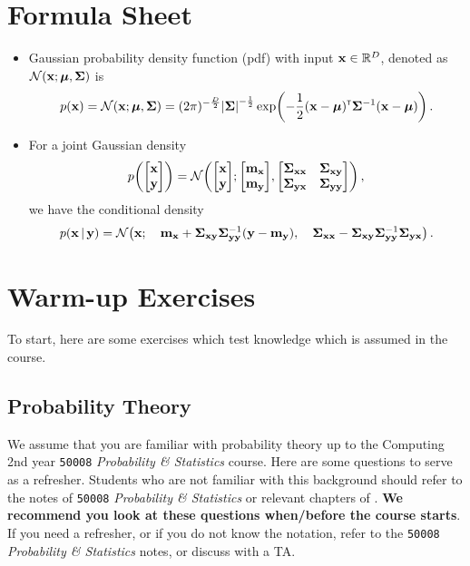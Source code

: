 \documentclass[a4paper]{article}
\newcommand{\mx}{\vm_\vx}
\newcommand{\my}{\vm_\vy}
\newcommand{\covmat}{\boldsymbol{\Sigma}}
\newcommand{\covx}{\boldsymbol{\Sigma}_{\vx\vx}}
\newcommand{\covy}{\boldsymbol{\Sigma}_{\vy\vy}}
\newcommand{\covxy}{\boldsymbol{\Sigma}_{\vx\vy}}
\newcommand{\covyx}{\boldsymbol{\Sigma}_{\vy\vx}}
\theoremstyle{definition}
\newcommand{\courseprobstats}{\texttt{50008} \textit{Probability \& Statistics}}
\begin{document}
\section{Formula Sheet}
\begin{itemize}
\item Gaussian probability density function (pdf) with input $\mathbf{x} \in \mathbb{R}^D$, denoted as  $\NormDist{\vx; \vmu, \covmat}$ is
\begin{align}
  p(\vx) = \NormDist{\vx; \vmu, \covmat} = (2\pi)^{-\frac{D}{2}}\detbar{\mathbf{\Sigma}}^{-\frac{1}{2}}\exp\left(-\frac{1}{2}(\vx - \vmu)\transpose\mathbf{\Sigma}^{-1}(\vx-\vmu)\right) \,.
\end{align}
\item For a joint Gaussian density
\begin{align}
\p{\begin{bmatrix}\vx \\ \vy\end{bmatrix}} = \NormDist{\begin{bmatrix}\vx \\ \vy\end{bmatrix}; \begin{bmatrix}\mx \\ \my\end{bmatrix}, \begin{bmatrix}\covx & \covxy \\ \covyx & \covy\end{bmatrix}} \label{eq:gauss-cond-joint} \,,
\end{align}
we have the conditional density
\begin{align}
\p{\vx\given\vy} = \NormDist{\vx; \quad\mx + \covxy\covy\inv(\vy-\my), \quad\covx - \covxy\covy\inv\covyx} \label{eq:gauss-cond} \,.
\end{align}
\end{itemize}





\section{Warm-up Exercises}
To start, here are some exercises which test knowledge which is assumed in the course.

\subsection{Probability Theory}
We assume that you are familiar with probability theory up to the Computing 2nd year \courseprobstats{} course. Here are some questions to serve as a refresher. Students who are not familiar with this background should refer to the notes of \courseprobstats{} or relevant chapters of \citep{mml}. \textbf{We recommend you look at these questions when/before the course starts}. If you need a refresher, or if you do not know the notation, refer to the \courseprobstats{} notes, or discuss with a TA.
\end{document}
